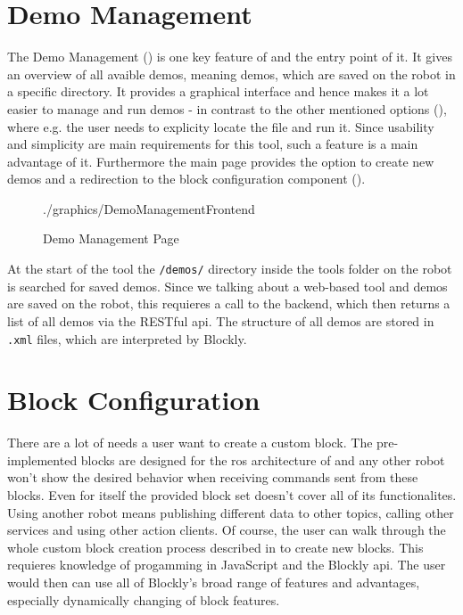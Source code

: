 \section{Demo Management}
The Demo Management () is one key feature of \toolname{} and the entry point of it. It gives an overview of all avaible demos, meaning demos, which are saved on the robot in a specific directory. It provides a graphical interface and hence makes it a lot easier to manage and run demos - in contrast to the other mentioned options (), where e.g. the user needs to explicity locate the file and run it. Since usability and simplicity are main requirements for this tool, such a feature is a main advantage of it. Furthermore the main page provides the option to create new demos and a redirection to the block configuration component ().

\begin{figure}[htbp]
	\centering
	\begin{overpic}[width=\linewidth]{./graphics/DemoManagementFrontend}
	\end{overpic}
	\caption{Demo Management Page}%
	\label{fig:DemoManagement}%
\end{figure}

At the start of the tool the \lstinline!/demos/! directory inside the tools folder on the robot is searched for saved demos. Since we talking about a web-based tool and demos are saved on the robot, this requieres a call to the backend, which then returns a list of all demos via the RESTful \gls{api}. The structure of all demos are stored in \lstinline!.xml! files, which are interpreted by Blockly.

\section{Block Configuration} \label{sec:BlockConfiguration}
There are a lot of needs a user want to create a custom block. The pre-implemented blocks are designed for the \gls{ros} architecture of \hobbit{} and any other robot won't show the desired behavior when receiving commands sent from these blocks. Even for \hobbit{} itself the provided block set doesn't cover all of its functionalites. Using another robot means publishing different data to other topics, calling other services and using other action clients. Of course, the user can walk through the whole custom block creation process described in  to create new blocks. This requieres knowledge of progamming in JavaScript and the Blockly \gls{api}. The user would then can use all of Blockly's broad range of features and advantages, especially dynamically changing of block features.

